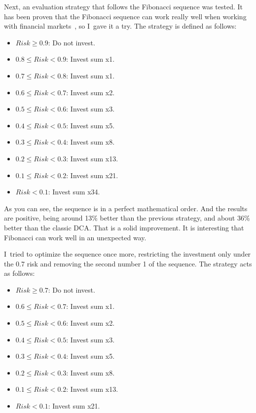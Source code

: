 Next, an evaluation strategy that follows the Fibonacci sequence was tested. It has been proven that the Fibonacci sequence can work really well when working with financial markets~\cite{investopedia:fibonacci}, so I~gave it a try. The strategy is defined as follows:
\begin{itemize}
    \item $Risk \ge  0.9$: Do not invest.
    \item $0.8 \le Risk < 0.9$: Invest sum x1.
    \item $0.7 \le Risk < 0.8$: Invest sum x1.
    \item $0.6 \le Risk < 0.7$: Invest sum x2.
    \item $0.5 \le Risk < 0.6$: Invest sum x3.
    \item $0.4 \le Risk < 0.5$: Invest sum x5.
    \item $0.3 \le Risk < 0.4$: Invest sum x8.
    \item $0.2 \le Risk < 0.3$: Invest sum x13.
    \item $0.1 \le Risk < 0.2$: Invest sum x21.
    \item $Risk < 0.1$: Invest sum x34.
\end{itemize}

As you can see, the sequence is in a perfect mathematical order. And the results are positive, being around 13\% better than the previous strategy, and about 36\% better than the classic DCA. That is a solid improvement. It is interesting that Fibonacci can work well in an unexpected way.

I~tried to optimize the sequence once more, restricting the investment only under the 0.7 risk and removing the second number 1 of the sequence. The strategy acts as follows:
\begin{itemize}
    \item $Risk \ge  0.7$: Do not invest.
    \item $0.6 \le Risk < 0.7$: Invest sum x1.
    \item $0.5 \le Risk < 0.6$: Invest sum x2.
    \item $0.4 \le Risk < 0.5$: Invest sum x3.
    \item $0.3 \le Risk < 0.4$: Invest sum x5.
    \item $0.2 \le Risk < 0.3$: Invest sum x8.
    \item $0.1 \le Risk < 0.2$: Invest sum x13.
    \item $Risk < 0.1$: Invest sum x21.
\end{itemize}

